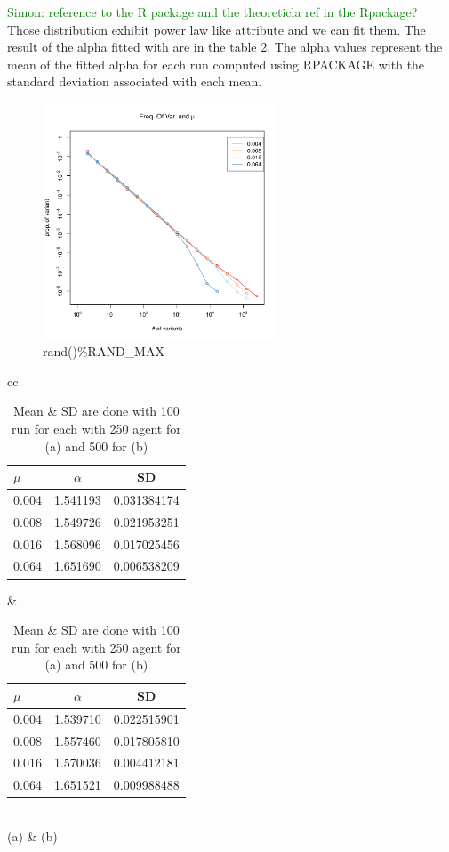 \documentclass{wscpaperproc}
\newcommand{\memo}[2]{\textcolor{#1}{#2}}
\newcommand{\simon}[1]{\memo{green}{Simon: #1\\}}
\begin{document}
\simon{reference to the R package and the theoreticla ref in the Rpackage?}
Those distribution exhibit power law like attribute and we can fit them. The result of the alpha fitted with are in the table \ref{tab:mualpha}. The alpha values represent the mean of the fitted alpha for each run computed using RPACKAGE with the standard deviation associated with each mean.
\begin{figure}[hbp]
	\begin{center}
		\includegraphics[width=7cm]{img/allmuRandMaxBentleyValues.pdf}
	\end{center}
	\caption{rand()\%RAND\_MAX}
	\label{fig:allMutation}
\end{figure}


\begin{table}
	\centering
	\begin{tabular}{cc}
		\begin{tabular}{l|cc}
			$\mu$ & $\alpha$ & SD\\\hline
			0.004&1.541193&0.031384174\\
			0.008&1.549726&0.021953251\\
			0.016&1.568096&0.017025456\\
			0.064&1.651690&0.006538209\\

		\end{tabular}
		&
		\begin{tabular}{l|cc}
			$\mu$ & $\alpha$ & SD\\\hline
			0.004&1.539710&0.022515901\\
			0.008&1.557460&0.017805810\\
			0.016&1.570036&0.004412181\\
			0.064&1.651521&0.009988488\\
		\end{tabular}\\
		(a) & (b)
	\end{tabular}
	\caption{Mean \& SD are done with 100 run for each with 250 agent for (a) and 500 for (b) }
	\label{tab:mualpha}
\end{table}
\end{document}
